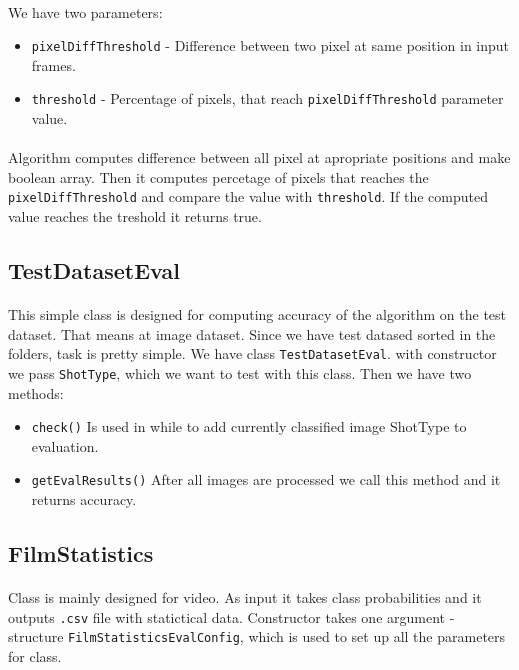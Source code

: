 \documentclass[english]{article}
\begin{document}
		\paragraph{}
			We have two parameters:
			\begin{itemize}
				\item \texttt{pixelDiffThreshold} - Difference between two pixel at same position in input frames.
				\item \texttt{threshold} - Percentage of pixels, that reach \texttt{pixelDiffThreshold} parameter value.
			\end{itemize}
		\paragraph{}
			Algorithm computes difference between all pixel at apropriate positions and make boolean array. Then 
			it computes percetage of pixels that reaches the \texttt{pixelDiffThreshold} and compare the value with \texttt{threshold}.
			If the computed value reaches the treshold it returns true.
			

	\subsection{TestDatasetEval}
		\paragraph{}
			This simple class is designed for computing accuracy of the algorithm on the test dataset. That means at image dataset.
			Since we have test datased sorted in the folders, task is pretty simple. We have class \texttt{TestDatasetEval}.
			with constructor we pass \texttt{ShotType}, which we want to test with this class. Then we have two methods:
			\begin{itemize}
				\item \texttt{check()} Is used in while to add currently classified image ShotType to evaluation.
				\item \texttt{getEvalResults()} After all images are processed we call this method and it returns accuracy.
			\end{itemize}

	\subsection{FilmStatistics} \label{filmstats}
		\paragraph{}
			Class is mainly designed for video. As input it takes class probabilities and it outputs \texttt{.csv} file with
			statictical data. Constructor takes one argument - structure \texttt{FilmStatisticsEvalConfig}, which is used to set up all the parameters
			for class.
\end{document}

